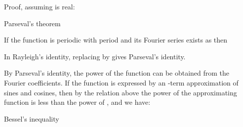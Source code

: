 \begin{EMproof}{}

Proof, assuming  is real:

\end{EMproof}

\EMhold


\begin{EMtheorem}{Parseval's theorem}

If the function  is periodic with period  and its Fourier series exists as
then

\end{EMtheorem}

\begin{EMproof}{}

In Rayleigh's identity, replacing  by  gives Parseval's identity.

\end{EMproof}

By Parseval's identity, the power of the function  can be obtained from the Fourier coefficients. If the function is expressed by an -term approximation of sines and cosines, then by the relation above the power of the approximating function is less than the power of , and we have:

\begin{EMimportant}{Bessel's inequality}


\end{EMimportant}

